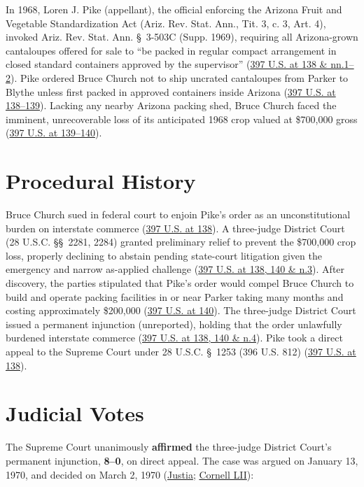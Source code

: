 \documentclass[12pt]{article}
\begin{document}
In 1968, Loren J. Pike (appellant), the official enforcing the Arizona Fruit and Vegetable Standardization Act (Ariz. Rev. Stat. Ann., Tit. 3, c. 3, Art. 4), invoked Ariz. Rev. Stat. Ann. \S~3-503C (Supp. 1969), requiring all Arizona-grown cantaloupes offered for sale to ``be packed in regular compact arrangement in closed standard containers approved by the supervisor'' (\href{https://supreme.justia.com/cases/federal/us/397/137/}{397 U.S. at 138 \& nn.1--2}). Pike ordered Bruce Church not to ship uncrated cantaloupes from Parker to Blythe unless first packed in approved containers inside Arizona (\href{https://supreme.justia.com/cases/federal/us/397/137/}{397 U.S. at 138--139}). Lacking any nearby Arizona packing shed, Bruce Church faced the imminent, unrecoverable loss of its anticipated 1968 crop valued at \$700,000 gross (\href{https://supreme.justia.com/cases/federal/us/397/137/}{397 U.S. at 139--140}).

\section{Procedural History}
Bruce Church sued in federal court to enjoin Pike's order as an unconstitutional burden on interstate commerce (\href{https://supreme.justia.com/cases/federal/us/397/137/}{397 U.S. at 138}). A three-judge District Court (28 U.S.C. \S\S~2281, 2284) granted preliminary relief to prevent the \$700,000 crop loss, properly declining to abstain pending state-court litigation given the emergency and narrow as-applied challenge (\href{https://supreme.justia.com/cases/federal/us/397/137/}{397 U.S. at 138, 140 \& n.3}). After discovery, the parties stipulated that Pike's order would compel Bruce Church to build and operate packing facilities in or near Parker taking many months and costing approximately \$200,000 (\href{https://supreme.justia.com/cases/federal/us/397/137/}{397 U.S. at 140}). The three-judge District Court issued a permanent injunction (unreported), holding that the order unlawfully burdened interstate commerce (\href{https://supreme.justia.com/cases/federal/us/397/137/}{397 U.S. at 138, 140 \& n.4}). Pike took a direct appeal to the Supreme Court under 28 U.S.C. \S~1253 (396 U.S. 812) (\href{https://supreme.justia.com/cases/federal/us/397/137/}{397 U.S. at 138}).

\section{Judicial Votes}
The Supreme Court unanimously \textbf{affirmed} the three-judge District Court's permanent injunction, \textbf{8--0}, on direct appeal. The case was argued on January 13, 1970, and decided on March 2, 1970 (\href{https://supreme.justia.com/cases/federal/us/397/137/}{Justia}; \href{https://www.law.cornell.edu/supremecourt/text/397/137}{Cornell LII}):
\end{document}
